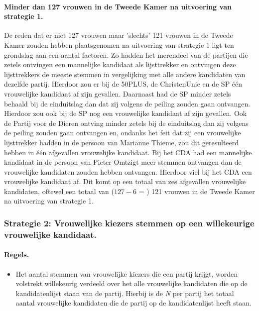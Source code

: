 \paragraph{Minder dan 127 vrouwen in de Tweede Kamer na uitvoering van strategie 1.}
De reden dat er niet 127 vrouwen maar 'slechts' 121 vrouwen in de Tweede Kamer zouden hebben plaatsgenomen na uitvoering van strategie 1 ligt ten grondslag aan een aantal factoren. Zo hadden het merendeel van de partijen die zetels ontvingen een mannelijke kandidaat als lijsttrekker en ontvingen deze lijsttrekkers de meeste stemmen in vergelijking met alle andere kandidaten van dezelfde partij. Hierdoor zou er bij de 50PLUS, de ChristenUnie en de SP één vrouwelijke kandidaat af zijn gevallen. Daarnaast had de SP minder zetels behaald bij de einduitslag dan dat zij volgens de peiling zouden gaan ontvangen. Hierdoor zou ook bij de SP nog een vrouwelijke kandidaat af zijn gevallen. Ook de Partij voor de Dieren ontving minder zetels bij de einduitslag dan zij volgens de peiling zouden gaan ontvangen en, ondanks het feit dat zij een vrouwelijke lijsttrekker hadden in de persoon van Marianne Thieme, zou dit geresulteerd hebben in één afgevallen vrouwelijke kandidaat. Bij het CDA had een mannelijke kandidaat in de persoon van Pieter Omtzigt meer stemmen ontvangen dan de vrouwelijke kandidaten zouden hebben ontvangen. Hierdoor viel bij het CDA een vrouwelijke kandidaat af. Dit komt op een totaal van zes afgevallen vrouwelijke kandidaten, oftewel een totaal van ($127-6$ = ) 121 vrouwen in de Tweede Kamer na uitvoering van strategie 1.  



\subsubsection{Strategie 2: Vrouwelijke kiezers stemmen op een willekeurige vrouwelijke kandidaat.}
\paragraph{Regels.}
\begin{itemize}
	\item
Het aantal stemmen van vrouwelijke kiezers die een partij krijgt, worden volstrekt willekeurig verdeeld over het alle vrouwelijke kandidaten die op de kandidatenlijst staan van de partij. Hierbij is de \textit{N} per partij het totaal aantal vrouwelijke kandidaten die de partij op de kandidatenlijst heeft staan. 	\\ 	
\end{itemize}	

